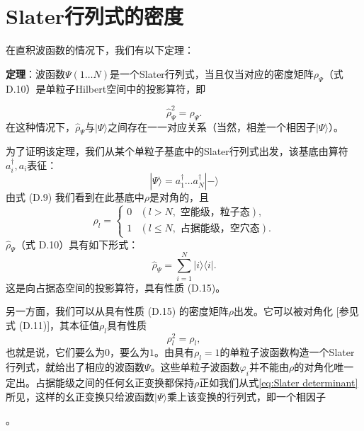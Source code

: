 \section{Slater行列式的密度\label{sec:Slater=00884C=005217=005F0F=007684=005355=007C92=005B50=005BC6=005EA6=0077E9=009635}}

在直积波函数的情况下，我们有以下定理：
\begin{center}
\textbf{定理}：波函数$\Psi(1\dots N)$是一个Slater行列式，当且仅当对应的密度矩阵$\rho_{\Psi}$（式
D.10）是单粒子Hilbert空间中的投影算符，即
\par\end{center}

\begin{equation}
\hat{\rho}^{2}_{\Psi}=\hat{\rho}_{\Psi}.\label{eq:property of projector}
\end{equation}
在这种情况下，$\hat{\rho}_{\Psi}$与$|\Psi\rangle$之间存在一一对应关系（当然，相差一个相因子$|\Psi\rangle$）。

为了证明该定理，我们从某个单粒子基底中的Slater行列式出发，该基底由算符$a^{\dagger}_{i},a_{i}$表征：
\begin{equation}
|\Psi\rangle=a^{\dagger}_{1}\dots a^{\dagger}_{N}|-\rangle\label{eq:Slater determinant}
\end{equation}
由式 (D.9) 我们看到在此基底中$\rho$是对角的，且
\begin{equation}
\rho_{l}=\begin{cases}
0 & (l>N,\text{ 空能级，粒子态}),\\
1 & (l\leqslant N,\text{ 占据能级，空穴态}).
\end{cases}\label{eq:appendix_d_rho_eigenvalues_slater}
\end{equation}
$\hat{\rho}_{\Psi}$（式 D.10）具有如下形式：
\begin{equation}
\hat{\rho}_{\Psi}=\sum^{N}_{i=1}|i\rangle\langle i|.\label{eq:appendix_d_rho_projector_sum}
\end{equation}
这是向占据态空间的投影算符，具有性质 (D.15)。

另一方面，我们可以从具有性质 (D.15) 的密度矩阵$\rho$出发。它可以被对角化 {[}参见式 (D.11){]}，其本征值$\rho_{l}$具有性质
\begin{equation}
\rho^{2}_{l}=\rho_{l},\label{eq:appendix_d_eigenvalue_idempotent}
\end{equation}
也就是说，它们要么为$0$，要么为$1$。由具有$\rho_{l}=1$的单粒子波函数构造一个Slater行列式，就给出了相应的波函数$\Psi$。这些单粒子波函数$\varphi_{i}$并不能由$\rho$的对角化唯一定出。占据能级之间的任何幺正变换都保持$\rho$正如我们从式\ref{eq:Slater determinant}所见，这样的幺正变换只给波函数$|\Psi\rangle$乘上该变换的行列式，即一个相因子

。

